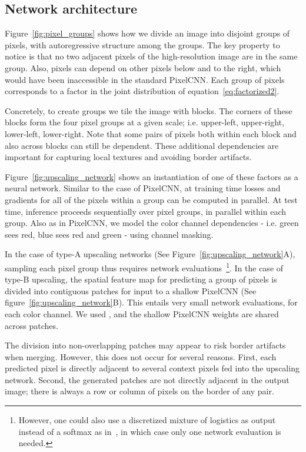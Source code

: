 \documentclass{article}
\begin{document}
\subsection{Network architecture}
Figure~\ref{fig:pixel_groups} shows how we divide an image into disjoint groups of pixels, with autoregressive structure among the groups.
The key property to notice is that no two adjacent pixels of the high-resolution image are in the same group.
Also, pixels can depend on other pixels below and to the right, which would have been inaccessible in the standard PixelCNN.
Each group of pixels corresponds to a factor in the joint distribution of equation~\ref{eq:factorized2}.






Concretely, to create groups we tile the image with  blocks.
The corners of these  blocks form the four pixel groups at a given scale; i.e. upper-left, upper-right, lower-left, lower-right.
Note that some pairs of pixels both within each block and also across blocks can still be dependent.
These additional dependencies are important for capturing local textures and avoiding border artifacts.

Figure~\ref{fig:upscaling_network} shows an instantiation of one of these factors as a neural network.
Similar to the case of PixelCNN, at training time losses and gradients for all of the pixels within a group can be computed in parallel.
At test time, inference proceeds sequentially over pixel groups, in parallel within each group.
Also as in PixelCNN, we model the color channel dependencies - i.e. green sees red, blue sees red and green - using channel masking.


In the case of type-A upscaling networks (See Figure~\ref{fig:upscaling_network}A), sampling each pixel group thus requires  network evaluations~\footnote{However, one could also use a discretized mixture of logistics as output instead of a softmax as in~\citet{salimans2017pixelcnn}, in which case only one network evaluation is needed.}.
In the case of type-B upscaling, the spatial feature map for predicting a group of pixels is divided into contiguous  patches for input to a shallow PixelCNN (See figure~\ref{fig:upscaling_network}B).
This entails  very small network evaluations, for each color channel.
We used , and the shallow PixelCNN weights are shared across patches.


The division into non-overlapping patches may appear to risk border artifacts when merging.
However, this does not occur for several reasons.
First, each predicted pixel is directly adjacent to several context pixels fed into the upscaling network.
Second, the generated patches are not directly adjacent in the  output image; there is always a row or column of pixels on the border of any pair.
\end{document}
